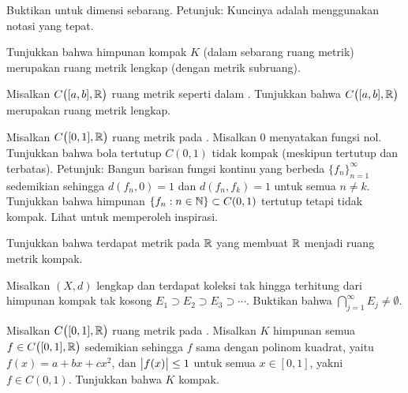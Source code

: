\begin{exercise}
Buktikan  untuk dimensi sebarang.
Petunjuk: Kuncinya adalah menggunakan notasi yang tepat.
\end{exercise}

\begin{exercise} \label{exercise:subspacecompact}
Tunjukkan bahwa himpunan kompak $K$ (dalam sebarang ruang metrik)
merupakan ruang metrik lengkap (dengan metrik subruang).
\end{exercise}

\begin{exercise} \label{exercise:CabRcomplete}
Misalkan $C\bigl([a,b],{\mathbb{R}}\bigr)$ ruang metrik seperti dalam .  Tunjukkan bahwa
$C\bigl([a,b],{\mathbb{R}}\bigr)$ merupakan ruang metrik lengkap.
\end{exercise}

\begin{exercise}[Menantang] \label{exercise:msclbounnotcompt}
Misalkan $C\bigl([0,1],{\mathbb{R}}\bigr)$ ruang metrik pada .  Misalkan $0$
menyatakan fungsi nol.  Tunjukkan bahwa bola tertutup
$C(0,1)$ tidak kompak (meskipun tertutup dan terbatas).
Petunjuk: Bangun barisan fungsi kontinu yang berbeda
$\{ f_n \}_{n=1}^\infty$ sedemikian sehingga
$d(f_n,0) = 1$ dan $d(f_n,f_k) = 1$ untuk semua $n \neq k$.  Tunjukkan bahwa
himpunan $\{ f_n : n \in {\mathbb{N}} \} \subset C(0,1)$ tertutup tetapi tidak kompak.
Lihat  untuk memperoleh inspirasi.
\end{exercise}

\begin{exercise}[Menantang]
Tunjukkan bahwa terdapat metrik pada ${\mathbb{R}}$ yang membuat ${\mathbb{R}}$ menjadi ruang metrik kompak.
\end{exercise}

\begin{exercise}
Misalkan $(X,d)$ lengkap dan terdapat koleksi tak hingga terhitung
dari himpunan kompak tak kosong $E_1 \supset E_2 \supset E_3 \supset
\cdots$.  Buktikan bahwa $\bigcap_{j=1}^\infty E_j \neq \emptyset$.
\end{exercise}

\begin{exercise}[Menantang]
Misalkan $C\bigl([0,1],{\mathbb{R}}\bigr)$ ruang metrik pada .
Misalkan $K$ himpunan semua $f \in C\bigl([0,1],{\mathbb{R}}\bigr)$ sedemikian sehingga
$f$ sama dengan polinom kuadrat, yaitu\ $f(x) = a+bx+cx^2$, dan
$\bigl\lvert {f(x)} \bigr\rvert \leq 1$ untuk semua $x \in [0,1]$,
yakni $f \in C(0,1)$.  Tunjukkan bahwa $K$ kompak.
\end{exercise}

